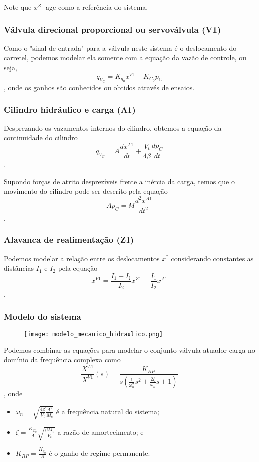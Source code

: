 \documentclass[a4paper]{report}
\begin{document}
Note que $x^{Z_1}$ age como a referência do sistema.

\subsubsection*{Válvula direcional proporcional ou servoválvula (V1)}

Como o "sinal de entrada" para a válvula neste sistema é o deslocamento do carretel, podemos modelar ela somente com a equação da vazão de controle, ou seja, \[
q_{V_C} = K_{q_0}x^{V1} - K_{C_0}p_C
\], onde os ganhos são conhecidos ou obtidos através de ensaios.

\subsubsection*{Cilindro hidráulico e carga (A1)}

Desprezando os vazamentos internos do cilindro, obtemos a equação da continuidade do cilindro \[
q_{V_C} = A \frac{dx^{A1}}{dt} + \frac{V_t}{4\beta} \frac{dp_C}{dt}
\].

Supondo forças de atrito desprezíveis frente a inércia da carga, temos que o movimento do cilindro pode ser descrito pela equação \[
Ap_C = M \frac{d^2x^{A1}}{dt^2}
\].

\subsubsection*{Alavanca de realimentação (Z1)}

Podemos modelar a relação entre os deslocamentos $x^{*}$ considerando constantes as distâncias $I_1$ e $I_2$ pela equação \[
x^{V1} = \frac{I_1 + I_2}{I_2}x^{Z1} - \frac{I_1}{I_2}x^{A1}
\].

\subsubsection*{Modelo do sistema}

\begin{figure}[H]
    \centering
    \texttt{[image: modelo\_mecanico\_hidraulico.png]}
\end{figure}

Podemos combinar as equações para modelar o conjunto válvula-atuador-carga no domínio da frequência complexa como \[
    \frac{X^{A1}}{X^{V1}}(s) = \frac{K_{RP}}{s\left( \frac{1}{\omega_n^2}s^2 + \frac{2\zeta}{\omega_n}s + 1 \right) }
\], onde
\begin{itemize}
    \item $\omega_n = \sqrt{\frac{4\beta}{V_t}\frac{A^2}{M_c}}$ é a frequência natural do sistema;
	\item $\zeta = \frac{K_{C_0}}{A}\sqrt{\frac{\beta M_c}{V_t}}$ a razão de amortecimento; e
	    \item $K_{RP} = \frac{K_{q_0}}{A}$ é o ganho de regime permanente.
\end{itemize}
\end{document}
